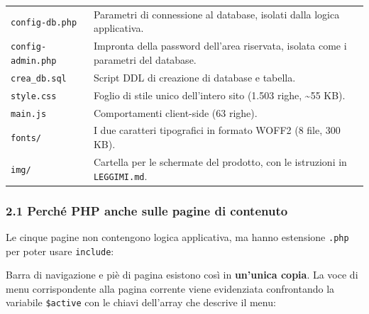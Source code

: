 \documentclass[
  11pt,
]{article}
\newenvironment{Shaded}{\begin{snugshade}}{\end{snugshade}}
\newcommand{\KeywordTok}[1]{\textcolor[rgb]{0.13,0.29,0.53}{\textbf{#1}}}
\newcommand{\NormalTok}[1]{#1}
\newcommand{\OperatorTok}[1]{\textcolor[rgb]{0.81,0.36,0.00}{\textbf{#1}}}
\newcommand{\OtherTok}[1]{\textcolor[rgb]{0.56,0.35,0.01}{#1}}
\newcommand{\StringTok}[1]{\textcolor[rgb]{0.31,0.60,0.02}{#1}}
\newcommand{\VariableTok}[1]{\textcolor[rgb]{0.00,0.00,0.00}{#1}}
\begin{document}
\begin{longtable}[]{@{}
  >{\raggedright\arraybackslash}p{}
  >{\raggedright\arraybackslash}p{}@{}}
\texttt{config-db.php} & Parametri di connessione al database, isolati
dalla logica applicativa. \\
\texttt{config-admin.php} & Impronta della password dell'area riservata,
isolata come i parametri del database. \\
\texttt{crea\_db.sql} & Script DDL di creazione di database e
tabella. \\
\texttt{style.css} & Foglio di stile unico dell'intero sito (1.503
righe, \textasciitilde55 KB). \\
\texttt{main.js} & Comportamenti client-side (63 righe). \\
\texttt{fonts/} & I due caratteri tipografici in formato WOFF2 (8 file,
300 KB). \\
\texttt{img/} & Cartella per le schermate del prodotto, con le
istruzioni in \texttt{LEGGIMI.md}. \\
\end{longtable}

\hypertarget{perchuxe9-php-anche-sulle-pagine-di-contenuto}{%
\subsubsection{2.1 Perché PHP anche sulle pagine di
contenuto}\label{perchuxe9-php-anche-sulle-pagine-di-contenuto}}

Le cinque pagine non contengono logica applicativa, ma hanno estensione
\texttt{.php} per poter usare \texttt{include}:

\begin{Shaded}
\end{Shaded}

Barra di navigazione e piè di pagina esistono così in \textbf{un'unica
copia}. La voce di menu corrispondente alla pagina corrente viene
evidenziata confrontando la variabile \texttt{\$active} con le chiavi
dell'array che descrive il menu:
\end{document}
